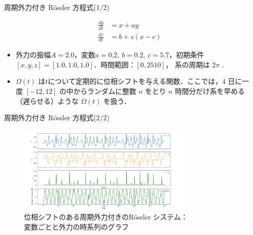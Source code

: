 \begin{frame}{周期外力付き Rössler 方程式(1/2)}
\begin{minipage}{0.59\textwidth}
\begin{align}
            \frac{dy}{dt} &= x + ay \\
            \frac{dz}{dt} &= b + z(x - c)
        \end{align}
        \vspace{-.5cm}
        \begin{itemize}
            \item 外力の振幅$A = 2.0$，変数$a = 0.2,\ b = 0.2,\ c = 5.7$，初期条件$ \left[ x, y, z \right] = [1.0, 1.0, 1.0]$．時間範囲：$[0, 2510]$， 系の周期は $2\pi$ .
            \item $\Omega(t)$ は$t$について定期的に位相シフトを与える関数．ここでは，$4$ 日に一度 $\left[ -12, 12 \right]$ の中からランダムに整数 $n$ をとり $n$ 時間分だけ系を早める（遅らせる）ような $\Omega(t)$ を扱う．    
        \end{itemize}
    \end{minipage}
\end{frame}

\begin{frame}{周期外力付き Rössler 方程式(2/2)}
    \begin{figure}
        \includegraphics[width=0.75\textwidth]{Fig/Plot_rossler_variables.png}
        \caption{位相シフトのある周期外力付きのRössler システム：\\変数ごとと外力の時系列のグラフ}
        \label{plot_rossler_attractor.png} %
    \end{figure}
\end{frame}

